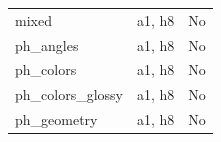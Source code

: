 \begin{longtable}{>{\raggedright\arraybackslash}p{.47\linewidth}>{\raggedright\arraybackslash}p{.25\linewidth}l}
mixed & %
a1, h8 & %
No \\ %

ph\_\allowbreak{}angles & %
a1, h8 & %
No \\ %

ph\_\allowbreak{}colors & %
a1, h8 & %
No \\ %

ph\_\allowbreak{}colors\_\allowbreak{}glossy & %
a1, h8 & %
No \\ %

ph\_\allowbreak{}geometry & %
a1, h8 & %
No \\ %


\end{longtable}

